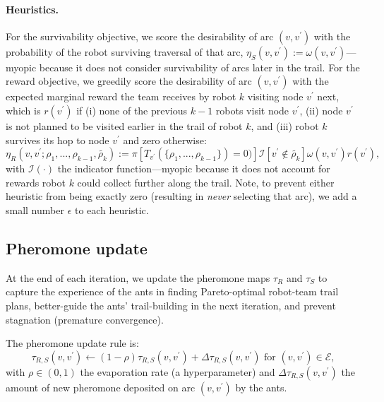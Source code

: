 \documentclass[11pt, oneside]{article}
\begin{document}

\paragraph{Heuristics.} 
For the survivability objective, we score the desirability of arc $(v, v^\prime)$ with the probability of the robot surviving traversal of that arc, $\eta_S(v, v^\prime):=\omega(v, v^\prime)$---myopic because it does not consider survivability of arcs later in the trail. 
For the reward objective, we greedily score the desirability of arc $(v, v^\prime)$ with the expected marginal reward the team receives by robot $k$ visiting node $v^\prime$ next, which is $r(v^\prime)$ if 
(i) none of the previous $k-1$ robots visit node $v^\prime$, 
(ii) node $v^\prime$ is not planned to be visited earlier in the trail of robot $k$, and
(iii) robot $k$ survives its hop to node $v^\prime$
and zero otherwise:
\begin{equation}
	\eta_R(v, v^\prime; \rho_1, ..., \rho_{k-1}, \tilde{\rho_k}) :=  
	 \pi[ T_{v^\prime}(\{\rho_1, ..., \rho_{k-1}\}) = 0)] \mathcal{I}[v^\prime \notin \tilde{\rho_k}] \omega(v, v^\prime) r(v^\prime ) ,
\end{equation}
with $\mathcal{I}(\cdot)$ the indicator function---myopic because it does not account for rewards robot $k$ could collect further along the trail. 
Note, to prevent either heuristic from being exactly zero (resulting in \emph{never} selecting that arc), we add a small number $\epsilon$ to each heuristic.


\subsection{Pheromone update}
At the end of each iteration, we update the pheromone maps $\tau_R$ and $\tau_S$ to capture the experience of the ants in finding Pareto-optimal robot-team trail plans, better-guide the ants' trail-building in the next iteration, and prevent stagnation (premature convergence). 


The pheromone update rule is:
\begin{equation}
	\tau_{R, S}(v, v^\prime) \leftarrow (1-\rho) \tau_{R,S}(v, v^\prime)  + \Delta \tau_{R,S}(v, v^\prime) \text{ for } (v, v^\prime) \in \mathcal{E}, \label{eq:tau_update}
\end{equation}
with $\rho \in (0, 1)$ the evaporation rate (a hyperparameter) and $\Delta \tau_{R,S}(v, v^\prime)$ the amount of new pheromone deposited on arc $(v, v^\prime)$ by the ants.
\end{document}
